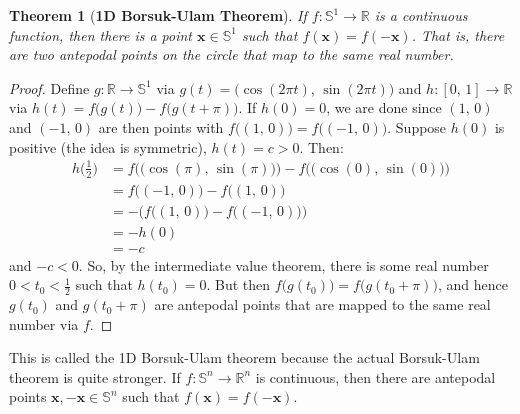 \documentclass{article}
\theoremstyle{plain}
\newtheorem{theorem}{Theorem}[section]
\theoremstyle{normal}
\begin{document}
         \begin{theorem}[\textbf{1D Borsuk-Ulam Theorem}]
            If $f:\mathbb{S}^{1}\rightarrow\mathbb{R}$ is a continuous
            function, then there is a point $\mathbf{x}\in\mathbb{S}^{1}$ such
            that $f(\mathbf{x})=f(-\mathbf{x})$. That is, there are two
            antepodal points on the circle that map to the same real number.
         \end{theorem}
         \begin{proof}
            Define $g:\mathbb{R}\rightarrow\mathbb{S}^{1}$ via
            $g(t)=\big(\cos(2\pi{t}),\,\sin(2\pi{t})\big)$ and
            $h:[0,\,1]\rightarrow\mathbb{R}$ via
            $h(t)=f\big(g(t)\big)-f\big(g(t+\pi)\big)$. If $h(0)=0$, we
            are done since $(1,\,0)$ and $(-1,\,0)$ are then points with
            $f\big((1,\,0)\big)=f\big((-1,\,0)\big)$. Suppose $h(0)$ is positive
            (the idea is symmetric), $h(t)=c>0$. Then:
            \begin{align}
                h\big(\frac{1}{2}\big)
                &=f\Big(\big(\cos(\pi),\,\sin(\pi)\big)\Big)-
                    f\big(\big(\cos(0),\,\sin(0)\big)\Big)\\
                &=f\big((-1,\,0)\big)-f\big((1,\,0)\big)\\
                &=-\Big(f\big((1,\,0)\big)-f\big((-1,\,0)\big)\Big)\\
                &=-h(0)\\
                &=-c
            \end{align}
            and $-c<0$. So, by the intermediate value theorem, there is some
            real number $0<t_{0}<\frac{1}{2}$ such that $h(t_{0})=0$. But then
            $f\big(g(t_{0})\big)=f\big(g(t_{0}+\pi)\big)$, and hence
            $g(t_{0})$ and $g(t_{0}+\pi)$ are antepodal points that are mapped
            to the same real number via $f$. 
         \end{proof}
         This is called the 1D Borsuk-Ulam theorem because the actual
         Borsuk-Ulam theorem is quite stronger. If
         $f:\mathbb{S}^{n}\rightarrow\mathbb{R}^{n}$ is continuous, then there
         are antepodal points $\mathbf{x},-\mathbf{x}\in\mathbb{S}^{n}$ such
         that $f(\mathbf{x})=f(-\mathbf{x})$.
\end{document}
